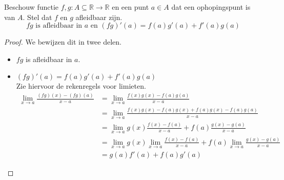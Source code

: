 \documentclass[main.tex]{subfiles}
\begin{document}
\begin{bpr}
  Beschouw functie $f,g: A \subseteq \mathbb{R} \rightarrow \mathbb{R}$ en een punt $a\in A$ dat een ophopingspunt is van $A$.
  Stel dat $f$ en $g$ afleidbaar zijn.
  \[ fg \text{ is afleidbaar in } a \text{ en } (fg)'(a) = f(a) g'(a) + f'(a)g(a) \]

  \begin{proof}
    We bewijzen dit in twee delen.
    \begin{itemize}
    \item $fg$ is afleidbaar in $a$.
    \item $(fg)'(a) = f(a) g'(a) + f'(a)g(a)$\\
      Zie hiervoor de rekenregels voor limieten.
      \[
      \begin{array}{rl}
        \lim_{x \rightarrow a}\frac{(fg)(x)-(fg)(a)}{x-a}
        &= \lim_{x \rightarrow a}\frac{f(x)g(x)-f(a)g(a)}{x-a}\\
        &= \lim_{x \rightarrow a}\frac{f(x)g(x)-f(a)g(x)+f(a)g(x) -f(a)g(a)}{x-a}\\
        &= \lim_{x \rightarrow a}g(x)\frac{f(x)-f(a)}{x-a} + f(a)\frac{g(x) -g(a)}{x-a}\\
        &= \lim_{x \rightarrow a}g(x)\lim_{x \rightarrow a}\frac{f(x)-f(a)}{x-a} + f(a)\lim_{x \rightarrow a}\frac{g(x) -g(a)}{x-a}\\
        &= g(a)f'(a) + f(a)g'(a)
      \end{array}
      \]
    \end{itemize}
  \end{proof}
\end{bpr}
\end{document}
